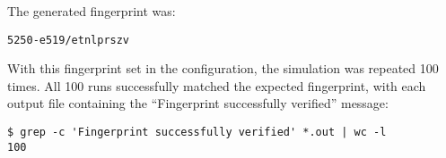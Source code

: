 The generated fingerprint was:
\begin{verbatim}
5250-e519/etnlprszv
\end{verbatim}

With this fingerprint set in the configuration, the simulation was repeated 100
times. All 100 runs successfully matched the expected fingerprint, with each
output file containing the ``Fingerprint successfully verified'' message:
\begin{verbatim}
$ grep -c 'Fingerprint successfully verified' *.out | wc -l
100
\end{verbatim}
